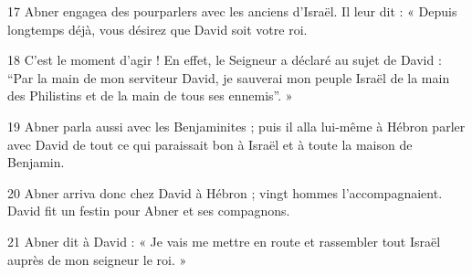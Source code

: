 
17 Abner engagea des pourparlers avec les anciens d’Israël. Il leur dit : « Depuis longtemps déjà, vous désirez que David soit votre roi.

18 C’est le moment d’agir ! En effet, le Seigneur a déclaré au sujet de David : “Par la main de mon serviteur David, je sauverai mon peuple Israël de la main des Philistins et de la main de tous ses ennemis”. »

19 Abner parla aussi avec les Benjaminites ; puis il alla lui-même à Hébron parler avec David de tout ce qui paraissait bon à Israël et à toute la maison de Benjamin.

20 Abner arriva donc chez David à Hébron ; vingt hommes l’accompagnaient. David fit un festin pour Abner et ses compagnons.

21 Abner dit à David : « Je vais me mettre en route et rassembler tout Israël auprès de mon seigneur le roi. » 